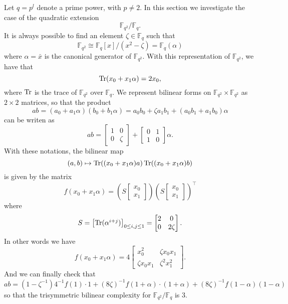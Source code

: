 \documentclass[a4paper,11pt]{article}
\begin{document}
Let $q=p^l$ denote a prime power, with $p\neq2$. In this section we investigate
the case of the quadratic extension 
\[
  \mathbb{F}_{q^2}/\mathbb{F}_q.
\]
It is always possible to find an element $\zeta\in\mathbb{F}_q$ such that 
\[
  \mathbb{F}_{q^2}\cong \mathbb{F}_{q}[x]/(x^2-\zeta)=\mathbb{F}_q(\alpha)
\]
where $\alpha=\bar x$ is the canonical generator of $\mathbb{F}_{q^2}$. With
this representation of $\mathbb{F}_{q^2}$, we have that
\[
  \operatorname{Tr}(x_0 + x_1\alpha) = 2x_0,
\]
where $\operatorname{Tr}$ is the trace of $\mathbb{F}_{q^2}$ over $\mathbb{F}_q$.
We represent
bilinear forms on $\mathbb{F}_{q^2}\times \mathbb{F}_{q^2}$ as $2\times2$
matrices, so that the product
\[
  ab = (a_0+a_1\alpha)(b_0+b_1\alpha)=a_0b_0+\zeta a_1b_1
  +(a_0b_1+a_1b_0)\alpha
\]
can be writen as
\[
  ab = 
  \begin{bmatrix}
    1 & 0 \\
    0 & \zeta
  \end{bmatrix}
  +
  \begin{bmatrix}
    0 & 1 \\
    1 & 0
  \end{bmatrix}\alpha.
\]
With these notations, the bilinear map 
\[
  (a, b)\mapsto \operatorname{Tr}((x_0+x_1\alpha)a)\operatorname{Tr}((x_0+x_1\alpha)b)
\]
is given by the matrix 
\[
  f(x_0+x_1\alpha)=
  \left(S 
  \begin{bmatrix}
    x_0 \\
    x_1
  \end{bmatrix}\right)
  \left(S 
  \begin{bmatrix}
    x_0 \\
    x_1
  \end{bmatrix}\right)^\intercal
\]
where
\[
  S =
  \begin{bmatrix}
    \operatorname{Tr}(\alpha^{i+j})
  \end{bmatrix}_{0\leq i, j\leq 1}
  =
  \begin{bmatrix}
   2 & 0 \\
   0 & 2\zeta
  \end{bmatrix}.
\]
In other words we have
\[
  f(x_0+x_1\alpha) = 
  4\begin{bmatrix}
   x_0^2 & \zeta x_0x_1 \\
   \zeta x_0 x_1 & \zeta^2 x_1^2
  \end{bmatrix}.
\]
And we can finally check that
\[
  ab = (1-\zeta^{-1})4^{-1}f(1)\cdot1 +
  (8\zeta)^{-1}f(1+\alpha)\cdot(1+\alpha)+(8\zeta)^{-1}f(1-\alpha)(1-\alpha)
\]
so that the trisymmetric bilinear complexity for
$\mathbb{F}_{q^2}/\mathbb{F}_{q}$ is $3$.
\end{document}
